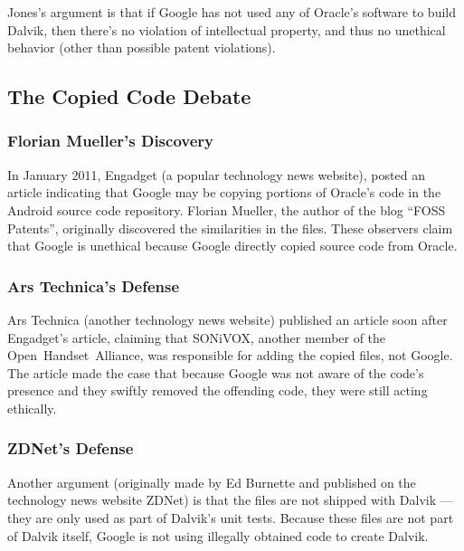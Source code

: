 \documentclass[11pt]{article}
\begin{document}
\begin{multicols}{2}
Jones's argument is that if Google has not used any of Oracle's software to
build Dalvik, then there's no violation of intellectual property, and thus no
unethical behavior (other than possible patent violations).


\subsection{The Copied Code Debate} %
\label{sub:fosspatents}

\subsubsection{Florian Mueller's Discovery} %
\label{ssub:fosspatents}

In January 2011, Engadget (a popular technology news website), posted an article
indicating that Google may be copying portions of Oracle's code in the Android
source code repository.  \cite{android-copies-java-code}  Florian Mueller, the
author of the blog ``FOSS Patents'', originally discovered the similarities in
the files.  \cite{fosspatents} These observers claim that Google is unethical
because Google directly copied source code from Oracle.


\subsubsection{Ars Technica's Defense} %
\label{ssub:arstechnica}

Ars Technica (another technology news website) published an article soon after
Engadget's article, claiming that SONiVOX, another member of the
Open~Handset~Alliance, was responsible for adding the copied files, not Google.
\cite{ars-tech-copying} The article made the case that because Google was not
aware of the code's presence and they swiftly removed the offending code, they
were still acting ethically.


\subsubsection{ZDNet's Defense} %
\label{ssub:zdnet}

Another argument (originally made by Ed Burnette and published on the technology
news website ZDNet) is that the files are not shipped with Dalvik --- they are
only used as part of Dalvik's unit tests. \cite{zdnet-copying}  Because these
files are not part of Dalvik itself, Google is not using illegally obtained code
to create Dalvik.


\end{multicols}
\end{document}
